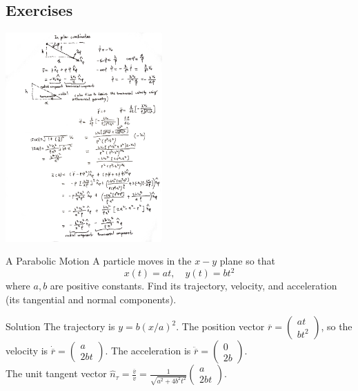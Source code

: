 \subsection{Exercises}
\begin{frame}
\includegraphics[height=8cm]{RC2PullingBoatRevisited.JPG}
\end{frame}
\begin{frame}
\begin{block}{A Parabolic Motion}
A particle moves in the $x-y$ plane so that
\[x(t)=at,\quad y(t)=bt^2\]
where $a,b$ are positive constants. Find its trajectory, velocity, and acceleration (its tangential and normal components).
\end{block}
\begin{block}{Solution}
The \alert{trajectory} is $y=b(x/a)^2$. The \alert{position vector} $\overline{r}=\left(\begin{matrix}at\\bt^2\end{matrix}\right)$, so the \alert{velocity} is $\dot{\overline{r}}=\left(\begin{matrix}a\\2bt\end{matrix}\right)$. The \alert{acceleration} is $\ddot{\overline{r}}=\left(\begin{matrix}0\\2b\end{matrix}\right)$.\\The \alert{unit tangent vector} $\hat n_\tau=\frac{\overline{v}}{v}=\frac{1}{\sqrt{a^2+4b^2t^2}}\left(\begin{matrix}a\\2bt\end{matrix}\right)$.
\end{block}
\end{frame}
